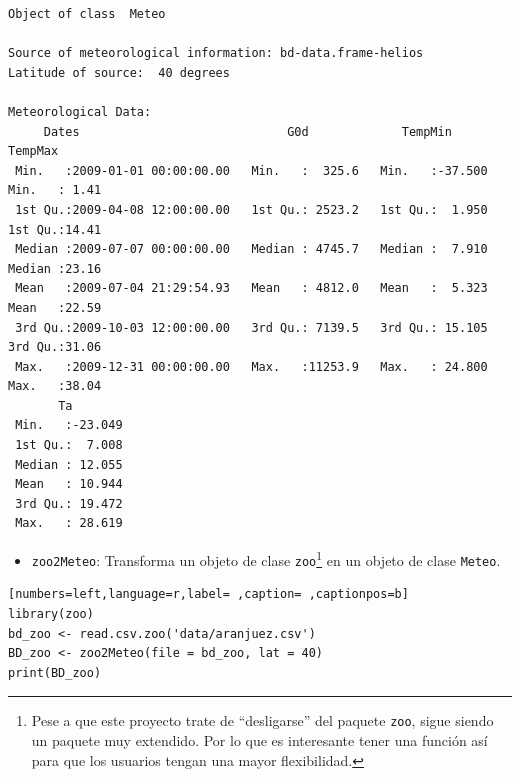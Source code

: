 \begin{verbatim}
Object of class  Meteo 

Source of meteorological information: bd-data.frame-helios 
Latitude of source:  40 degrees

Meteorological Data:
     Dates                             G0d             TempMin           TempMax     
 Min.   :2009-01-01 00:00:00.00   Min.   :  325.6   Min.   :-37.500   Min.   : 1.41  
 1st Qu.:2009-04-08 12:00:00.00   1st Qu.: 2523.2   1st Qu.:  1.950   1st Qu.:14.41  
 Median :2009-07-07 00:00:00.00   Median : 4745.7   Median :  7.910   Median :23.16  
 Mean   :2009-07-04 21:29:54.93   Mean   : 4812.0   Mean   :  5.323   Mean   :22.59  
 3rd Qu.:2009-10-03 12:00:00.00   3rd Qu.: 7139.5   3rd Qu.: 15.105   3rd Qu.:31.06  
 Max.   :2009-12-31 00:00:00.00   Max.   :11253.9   Max.   : 24.800   Max.   :38.04  
       Ta         
 Min.   :-23.049  
 1st Qu.:  7.008  
 Median : 12.055  
 Mean   : 10.944  
 3rd Qu.: 19.472  
 Max.   : 28.619
\end{verbatim}

\begin{itemize}
\item \texttt{zoo2Meteo}: Transforma un objeto de clase \texttt{zoo}\footnote{Pese a que este proyecto trate de ``desligarse'' del paquete \texttt{zoo}, sigue siendo un paquete muy extendido. Por lo que es interesante tener una función así para que los usuarios tengan una mayor flexibilidad.} en un objeto de clase \texttt{Meteo}.
\end{itemize}
\begin{lstlisting}[numbers=left,language=r,label= ,caption= ,captionpos=b]
library(zoo)
bd_zoo <- read.csv.zoo('data/aranjuez.csv')
BD_zoo <- zoo2Meteo(file = bd_zoo, lat = 40)
print(BD_zoo)
\end{lstlisting}

